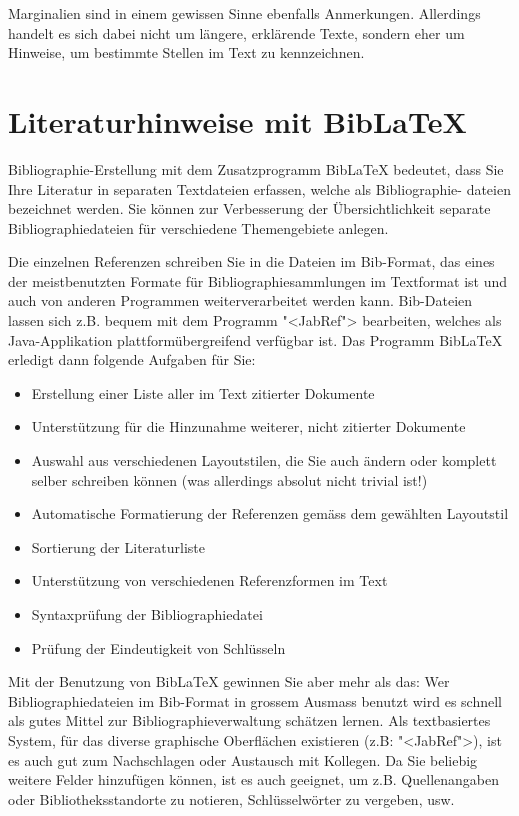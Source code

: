 \documentclass[11pt, a4paper,draft]{article}
\let\oldmarginpar\marginpar
\renewcommand{\marginpar}[1]{\oldmarginpar{\textit{#1}}}
\begin{document}
Marginalien\marginpar{Marginalien} sind in einem gewissen Sinne ebenfalls Anmerkungen. Allerdings handelt es sich dabei nicht um längere, erklärende Texte, sondern eher um Hinweise, um bestimmte Stellen im Text zu kennzeichnen.

\section{Literaturhinweise mit Bib\LaTeX}
Bibliographie-Erstellung mit dem Zusatzprogramm Bib\LaTeX{} bedeutet, dass Sie Ihre Literatur in separaten Textdateien erfassen, welche als Bibliographie- dateien bezeichnet werden. Sie können zur Verbesserung der Übersichtlichkeit separate Bibliographiedateien für verschiedene Themengebiete anlegen.

Die einzelnen Referenzen schreiben Sie in die Dateien im Bib-Format, das eines der meistbenutzten Formate für Bibliographiesammlungen im Textformat ist und auch von anderen Programmen weiterverarbeitet werden kann. Bib-Dateien lassen sich z.B. bequem mit dem Programm "<JabRef"> bearbeiten, welches als Java-Applikation plattformübergreifend verfügbar ist.
Das Programm Bib\LaTeX{} erledigt dann folgende Aufgaben für Sie:
\begin{itemize}
\item Erstellung einer Liste aller im Text zitierter Dokumente
\item Unterstützung für die Hinzunahme weiterer, nicht zitierter Dokumente
\item Auswahl aus verschiedenen Layoutstilen, die Sie auch ändern oder komplett selber schreiben können (was allerdings absolut nicht trivial ist!)
\item Automatische Formatierung der Referenzen gemäss dem gewählten Layoutstil
\item Sortierung der Literaturliste
\item Unterstützung von verschiedenen Referenzformen im Text
\item Syntaxprüfung der Bibliographiedatei
\item Prüfung der Eindeutigkeit von Schlüsseln
\end{itemize}
Mit der Benutzung von Bib\LaTeX{} gewinnen Sie aber mehr als das: Wer Bibliographiedateien im Bib-Format in grossem Ausmass benutzt wird es schnell als gutes Mittel zur Bibliographieverwaltung schätzen lernen. Als textbasiertes System, für das diverse graphische Oberflächen existieren (z.B: "<JabRef">), ist es auch gut zum Nachschlagen oder Austausch mit Kollegen. Da Sie beliebig weitere Felder hinzufügen können, ist es auch geeignet, um z.B. Quellenangaben oder Bibliotheksstandorte zu notieren, Schlüsselwörter zu vergeben, usw.
\end{document}
